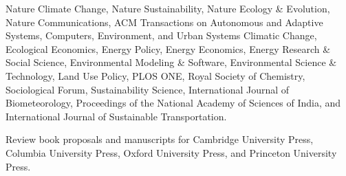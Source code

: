   Nature Climate Change,
  Nature Sustainability,
  Nature Ecology \& Evolution,
  Nature Communications,
  ACM Transactions on Autonomous and Adaptive Systems,
  Computers, Environment, and Urban Systems
  Climatic Change,
  Ecological Economics,
  Energy Policy,
  Energy Economics,
  Energy Research \& Social Science,
  Environmental Modeling \& Software,
  Environmental Science \& Technology,
  Land Use Policy,
  PLOS ONE,
  Royal Society of Chemistry,
  Sociological Forum,
  Sustainability Science,
  International Journal of Biometeorology,
  Proceedings of the National Academy of Sciences of India,
  and
  International Journal of Sustainable Transportation.
\item[Ongoing] Review book proposals and manuscripts for
  Cambridge University Press,
  Columbia University Press,
  Oxford University Press,
  and Princeton University Press.
